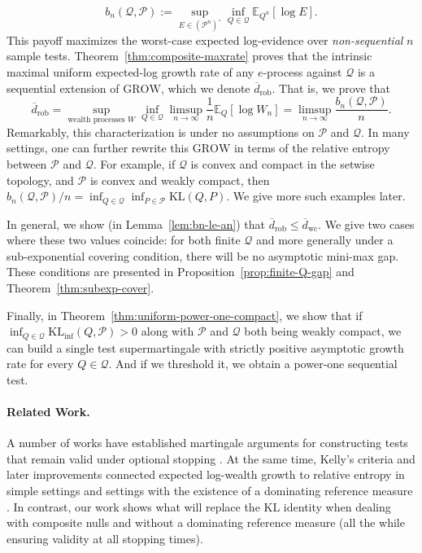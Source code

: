 \documentclass[11pt]{article}
\newcommand{\KL}{\mathrm{KL}}
\newcommand{\KLinf}{\mathrm{KL}_{\mathrm{inf}}}
\newcommand{\E}{\mathbb{E}}
\newcommand{\Pcal}{\mathcal{P}}
\newcommand{\Qcal}{\mathcal{Q}}
\theoremstyle{definition}
\theoremstyle{definition}
\begin{document}
\[
b_n(\Qcal,\Pcal):=\sup_{E\in(\Pcal^n)^{\circ}}\inf_{Q\in\Qcal}\E_{Q^n}[\log E].
\]
This payoff maximizes the worst-case expected log-evidence over \emph{non-sequential} $n$ sample tests. Theorem~\ref{thm:composite-maxrate} proves that the intrinsic maximal uniform expected-log growth rate of any $e$-process against $\Qcal$ is a sequential extension of $\mathrm{GROW}$, which we denote $\overline d_{\mathrm{rob}}$. That is, we prove that
\[
\overline d_{\mathrm{rob}}  = \sup_{\text{wealth processes } W} \inf_{Q \in \Qcal} \limsup_{n \to \infty} \frac1n \E_Q[\log W_n] = \limsup_{n\to\infty}\frac{b_n(\Qcal,\Pcal)}{n}.
\]
Remarkably, this characterization is under no assumptions on $\Pcal$ and $\Qcal$. 
In many settings, one can further rewrite this $\mathrm{GROW}$ in terms of the relative entropy between $\Pcal$ and $\Qcal$. For example, if $\Qcal$ is convex and compact in the setwise topology, and $\Pcal$ is convex and weakly compact, then $b_n(\Qcal,\Pcal)/n = \inf_{Q \in \Qcal}\inf_{P \in \Pcal}\KL(Q,P)$. We give more such examples later.  

In general, we show (in Lemma~\ref{lem:bn-le-an}) that $\overline d_{\mathrm{rob}}\le \overline d_{\mathrm{wc}}$. 
We give two cases where these two values coincide: for both finite $\Qcal$ and more generally under a sub-exponential covering condition, there will be no asymptotic mini-max gap. These conditions are presented in Proposition~\ref{prop:finite-Q-gap} and Theorem~\ref{thm:subexp-cover}.

Finally, in Theorem~\ref{thm:uniform-power-one-compact}, we show that if  $\inf_{Q\in\Qcal}\KLinf(Q,\Pcal)>0$ along with $\Pcal$ and $\Qcal$ both being weakly compact, we can build a single test supermartingale with strictly positive asymptotic growth rate for every $Q\in\Qcal$. And if we threshold it, we obtain a power-one sequential test. 

\paragraph{Related Work.}
A number of works have established martingale arguments for constructing tests that remain valid under optional stopping \parencite{ville1939etude, doob1953stochastic, robbins1970}. At the same time, Kelly's criteria and later improvements connected expected log-wealth growth to relative entropy in simple settings and settings with the existence of a dominating reference measure  \parencite{kellyinterpretation, cover1991universal, CoverThomas2006}. In contrast, our work shows what will replace the $\KL$ identity when dealing with composite nulls and without a dominating reference measure (all the while ensuring validity at all stopping times).
\end{document}
